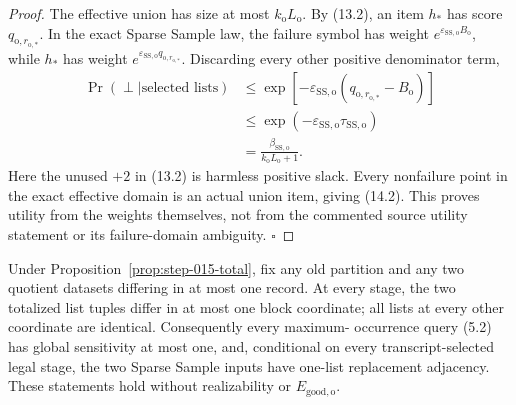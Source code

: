 \begin{proof}
The effective union has size at most \(k_{\mathrm o}L_{\mathrm o}\).
By (13.2), an item \(h_*\) has score
\(q_{\mathrm o,r_{\mathrm o,*}}\). In the exact Sparse Sample law, the
failure symbol has weight
\(e^{\varepsilon_{\mathrm{SS,o}}B_{\mathrm o}}\), while \(h_*\) has
weight
\(e^{\varepsilon_{\mathrm{SS,o}}q_{\mathrm o,r_{\mathrm o,*}}}\).
Discarding every other positive denominator term,
\[
\begin{aligned}
\Pr(\perp\mid\text{selected lists})
&\le
\exp[-\varepsilon_{\mathrm{SS,o}}
(q_{\mathrm o,r_{\mathrm o,*}}-B_{\mathrm o})]\\
&\le
\exp(-\varepsilon_{\mathrm{SS,o}}\tau_{\mathrm{SS,o}})\\
&=\frac{\beta_{\mathrm{SS,o}}}
{k_{\mathrm o}L_{\mathrm o}+1}.
\end{aligned}
\tag{14.3}
\]
Here the unused \(+2\) in (13.2) is harmless positive slack. Every
nonfailure point in the exact effective domain is an actual union item,
giving (14.2). This proves utility from the weights themselves, not from
the commented source utility statement or its failure-domain ambiguity.
\(\square\)


\end{proof}

\begin{lemma}\label{lem:step-015-locality}
Under Proposition~\ref{prop:step-015-total}, fix any old partition and any
two quotient datasets differing in at most one record. At every stage, the
two totalized list tuples differ in at most one block coordinate; all lists
at every other coordinate are identical. Consequently every maximum-
occurrence query (5.2) has global sensitivity at most one, and, conditional
on every transcript-selected legal stage, the two Sparse Sample inputs
have one-list replacement adjacency. These statements hold without
realizability or \(E_{\mathrm{good,o}}\).


\end{lemma}

